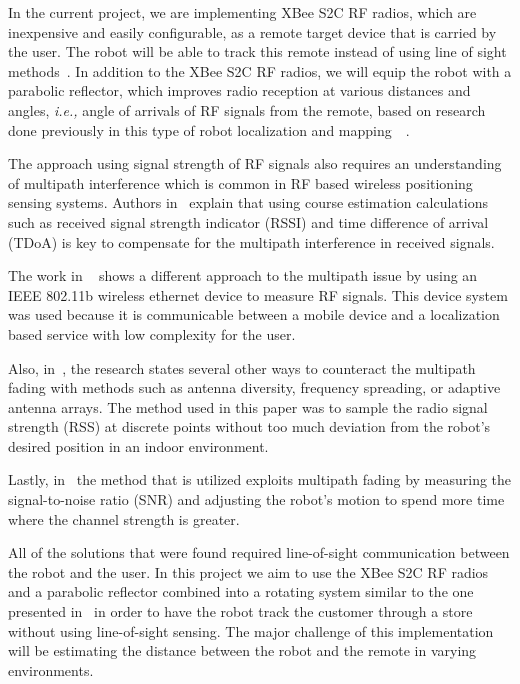 \vspace*{12pt}
\noindent
In the current project, we are implementing XBee S2C RF radios, which are inexpensive and easily configurable, as a remote target device that is carried by the user. The robot will be able to track this remote instead of using line of sight methods~\cite{Miah2018-Intelligent}. In addition to the XBee S2C RF radios, we will equip the robot with a parabolic reflector, which improves radio reception at various distances and angles, \textit{i.e.,} angle of arrivals of RF signals from the remote, based on research done previously in this type of robot localization and mapping~\cite{Miah2018-Intelligent}~\cite{Li2013ANA}.

\vspace*{12pt}
\noindent
The approach using signal strength of RF signals also requires an understanding of multipath interference which is common in RF based wireless positioning sensing systems. Authors in~\cite{xie_jiang_zhao_zhang_2019} explain that using course estimation calculations such as received signal strength indicator (RSSI) and time difference of arrival (TDoA) is key to compensate for the multipath interference in received signals.

\vspace*{12pt}
\noindent
The work in ~\cite{ladd_bekris_rudys_kavraki_wallach_2005} shows a different approach to the multipath issue by using an IEEE 802.11b wireless ethernet device to measure RF signals. This device system was used because it is communicable between a mobile device and a localization based service with low complexity for the user.

\vspace*{12pt}
\noindent
Also, in~\cite{lindhe_johansson_bicchi_2007}, the research states several other ways to counteract the multipath fading with methods such as antenna diversity, frequency spreading, or adaptive antenna arrays. The method used in this paper was to sample the radio signal strength (RSS) at discrete points without too much deviation from the robot's desired position in an indoor environment.

\vspace*{12pt}
\noindent
Lastly, in~\cite{Lindhe2009} the method that is utilized exploits multipath fading by measuring the signal-to-noise ratio (SNR) and adjusting the robot's motion to spend more time where the channel strength is greater.

\vspace*{12pt}
\noindent
All of the solutions that were found required line-of-sight communication between the robot and the user. In this project we aim to use the XBee S2C RF radios and a parabolic reflector combined into a rotating system similar to the one presented in~\cite{Miah2018-Intelligent} in order to have the robot track the customer through a store without using line-of-sight sensing. The major challenge of this implementation will be estimating the distance between the robot and the remote in varying environments.

